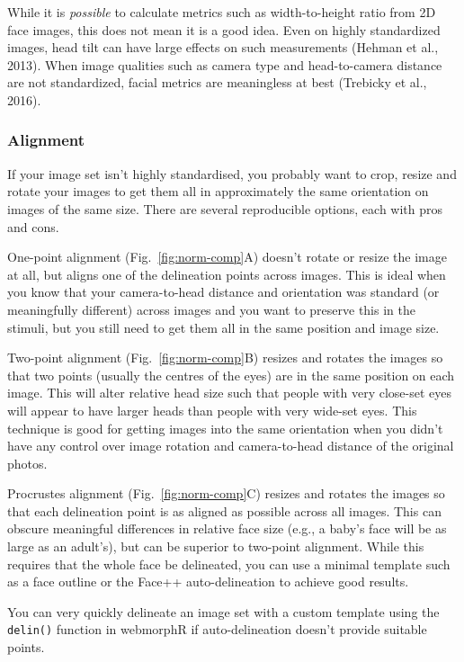 \documentclass[
  doc,floatsintext]{apa6}
\begin{document}
While it is \emph{possible} to calculate metrics such as width-to-height ratio from 2D face images, this does not mean it is a good idea. Even on highly standardized images, head tilt can have large effects on such measurements (Hehman et al., 2013). When image qualities such as camera type and head-to-camera distance are not standardized, facial metrics are meaningless at best (Trebicky et al., 2016).

\hypertarget{alignment}{%
\subsubsection{Alignment}\label{alignment}}

If your image set isn't highly standardised, you probably want to crop, resize and rotate your images to get them all in approximately the same orientation on images of the same size. There are several reproducible options, each with pros and cons.

One-point alignment (Fig.~\ref{fig:norm-comp}A) doesn't rotate or resize the image at all, but aligns one of the delineation points across images. This is ideal when you know that your camera-to-head distance and orientation was standard (or meaningfully different) across images and you want to preserve this in the stimuli, but you still need to get them all in the same position and image size.

Two-point alignment (Fig.~\ref{fig:norm-comp}B) resizes and rotates the images so that two points (usually the centres of the eyes) are in the same position on each image. This will alter relative head size such that people with very close-set eyes will appear to have larger heads than people with very wide-set eyes. This technique is good for getting images into the same orientation when you didn't have any control over image rotation and camera-to-head distance of the original photos.

Procrustes alignment (Fig.~\ref{fig:norm-comp}C) resizes and rotates the images so that each delineation point is as aligned as possible across all images. This can obscure meaningful differences in relative face size (e.g., a baby's face will be as large as an adult's), but can be superior to two-point alignment. While this requires that the whole face be delineated, you can use a minimal template such as a face outline or the Face++ auto-delineation to achieve good results.

You can very quickly delineate an image set with a custom template using the \texttt{delin()} function in webmorphR if auto-delineation doesn't provide suitable points.
\end{document}
